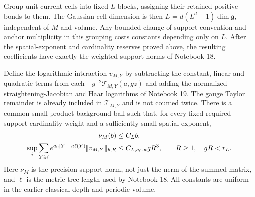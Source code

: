 \documentclass[11pt]{article}
\theoremstyle{remark}
\begin{document}
Group unit current cells into fixed $L$-blocks, assigning their
retained positive bonds to them. The Gaussian cell dimension
is then $D=d(L^d-1)\dim\mathfrak g$, independent of $M$ and
volume. Any bounded change of support convention and anchor
multiplicity in this grouping costs constants depending only
on $L$. After the spatial-exponent and cardinality reserves
proved above, the resulting coefficients have exactly the
weighted support norms of Notebook 18.

Define the logarithmic interaction $v_{M,Y}$ by subtracting
the constant, linear and quadratic terms from each
$-g^{-2}\mathcal T_{M,Y}(a,gz)$ and adding the normalized
straightening-Jacobian and Haar logarithms of Notebook 19.
The gauge Taylor remainder is already included in
$\mathcal T_{M,Y}$ and is not counted twice. There is a
common small product background ball such that, for every
fixed required support-cardinality weight and a sufficiently
small spatial exponent,
\begin{align}
 \nu_M(b)&\le C_L b,\label{ci-inputs}\\
 \sup_i\sum_{Y\ni i}e^{a_0|Y|+\kappa\ell(Y)}
                      \|v_{M,Y}\|_{b,R}
       &\le C_{L,a_0,\kappa}gR^3,
       \qquad R\ge1,\quad gR<r_L.\notag
\end{align}
Here $\nu_M$ is the precision support norm, not just the
norm of the summed matrix, and $\ell$ is the metric tree
length used by Notebook 18. All constants are uniform in
the earlier classical depth and periodic volume.
\end{document}
